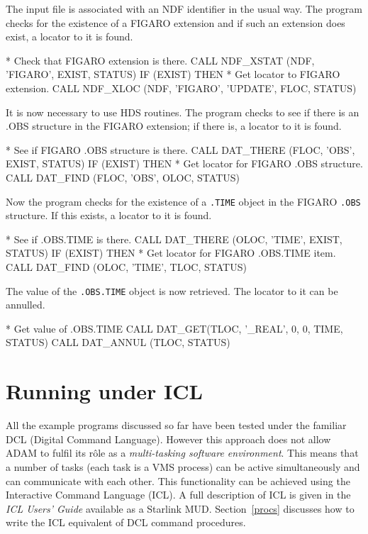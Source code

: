 \documentclass[twoside,11pt,nolof]{starlink}
\begin{document}
The input file is associated with an NDF identifier in the usual way.
The program checks for the existence of a FIGARO extension and if such an
extension does exist,  a locator to it is found.
\begin{terminalv}
*   Check that FIGARO extension is there.
      CALL NDF_XSTAT (NDF, 'FIGARO', EXIST, STATUS)
      IF (EXIST) THEN
*      Get locator to FIGARO extension.
         CALL NDF_XLOC (NDF, 'FIGARO', 'UPDATE', FLOC, STATUS)
\end{terminalv}
It is now necessary to use HDS routines.
The program checks to see if there is an .OBS structure in the FIGARO
extension; if there is, a locator to it is found.
\begin{terminalv}
*      See if FIGARO .OBS  structure is there.
         CALL DAT_THERE (FLOC, 'OBS', EXIST, STATUS)
         IF (EXIST) THEN
*         Get locator for FIGARO .OBS structure.
            CALL DAT_FIND (FLOC, 'OBS', OLOC, STATUS)
\end{terminalv}
Now the program checks for the existence of a {\tt.TIME} object in the
FIGARO {\tt.OBS} structure. If this exists, a locator to it is found.
\begin{terminalv}
*         See if .OBS.TIME is there.
            CALL DAT_THERE (OLOC, 'TIME', EXIST, STATUS)
            IF (EXIST) THEN
*            Get locator for FIGARO .OBS.TIME item.
               CALL DAT_FIND (OLOC, 'TIME', TLOC, STATUS)
\end{terminalv}
The value of the \texttt{.OBS.TIME} object is now retrieved. The locator to
it can be annulled.
\begin{terminalv}
*            Get value of .OBS.TIME
               CALL DAT_GET(TLOC, '_REAL', 0, 0, TIME, STATUS)
               CALL DAT_ANNUL (TLOC, STATUS)
\end{terminalv}

\newpage
\section{Running under ICL\label{icl}}

All the example programs discussed so far have been tested under
the familiar DCL (Digital Command Language).
However this approach does not allow ADAM to fulfil its r{\^o}le  as
a {\sl multi-tasking software environment}.
This means that a number of tasks (each task is a VMS process)
can be active simultaneously and can  communicate with each other.
This functionality can be achieved using the
Interactive Command Language (ICL).
A full description of ICL is given in the {\sl ICL Users' Guide\/} available
as a Starlink MUD.
Section~\ref{procs} discusses how
to write the ICL equivalent of DCL command procedures.
\end{document}
